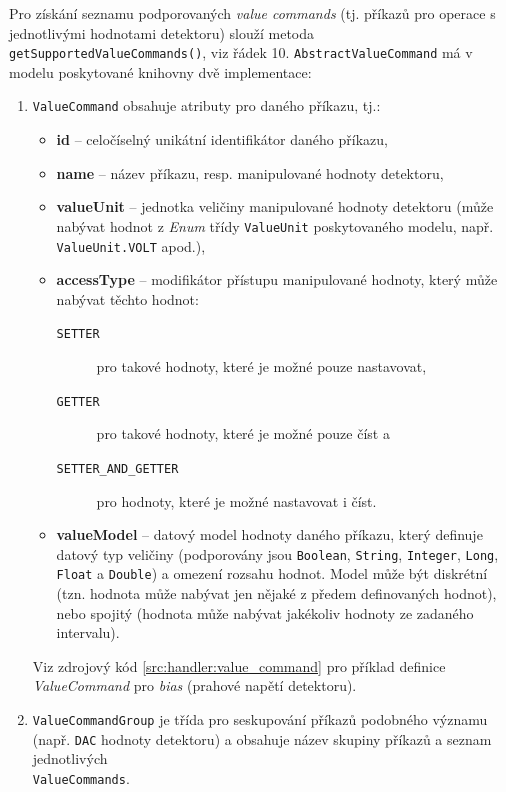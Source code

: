 Pro získání seznamu podporovaných \textit{value commands} (tj. příkazů pro operace s jednotlivými hodnotami detektoru) slouží metoda \texttt{getSupportedValueCommands()}, viz řádek 10. \texttt{AbstractValueCommand} má v modelu poskytované knihovny dvě implementace:
\begin{enumerate}[label=(\roman*)]
	\item \texttt{ValueCommand} obsahuje atributy pro daného příkazu, tj.:
	\begin{itemize}
		\item \textbf{id} -- celočíselný unikátní identifikátor daného příkazu,
		\item \textbf{name} -- název příkazu, resp. manipulované hodnoty detektoru,
		\item \textbf{valueUnit} -- jednotka veličiny manipulované hodnoty detektoru (může nabývat hodnot z \textit{Enum} třídy \texttt{ValueUnit} poskytovaného modelu, např. \texttt{ValueUnit.VOLT} apod.),
		\item \textbf{accessType} -- modifikátor přístupu manipulované hodnoty, který může nabývat těchto hodnot:
		\begin{description}
			\item[\texttt{SETTER}] pro takové hodnoty, které je možné pouze nastavovat,
			\item[\texttt{GETTER}] pro takové hodnoty, které je možné pouze číst a
			\item[\texttt{SETTER\_AND\_GETTER}] pro hodnoty, které je možné nastavovat i číst.
		\end{description}
		\item \textbf{valueModel} -- datový model hodnoty daného příkazu, který definuje datový typ veličiny (podporovány jsou \texttt{Boolean}, \texttt{String}, \texttt{Integer}, \texttt{Long}, \texttt{Float} a \texttt{Double}) a omezení rozsahu hodnot. Model může být diskrétní (tzn. hodnota může nabývat jen nějaké z předem definovaných hodnot), nebo spojitý (hodnota může nabývat jakékoliv hodnoty ze zadaného intervalu).
	\end{itemize}
	Viz zdrojový kód \ref{src:handler:value_command} pro příklad definice \textit{ValueCommand} pro \textit{bias} (prahové napětí detektoru).

	\item \texttt{ValueCommandGroup} je třída pro seskupování příkazů podobného významu (např. \texttt{DAC} hodnoty detektoru) a obsahuje název skupiny příkazů a seznam jednotlivých\\\texttt{ValueCommands}.
\end{enumerate}

